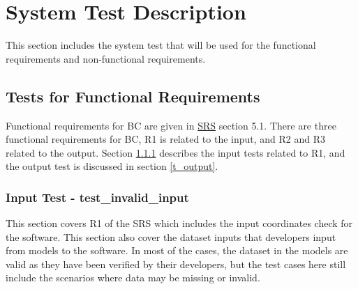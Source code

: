 \documentclass[12pt, titlepage]{article}
\begin{document}




\section{System Test Description}\label{STD}
This section includes the system test that will be used for the functional requirements and non-functional requirements.
\subsection{Tests for Functional Requirements}
Functional requirements for BC are given in \href{https://github.com/CynthiaLiu0805/BridgeCorrosion/blob/main/docs/SRS/SRS.pdf}{SRS} section 5.1. There are three functional requirements for BC, R1 is related to the input, and R2 and R3 related to the output. Section \ref{t_input} describes the input tests related to R1, and the output test is discussed in section \ref{t_output}.
\\



\subsubsection{Input Test - test\_invalid\_input}\label{t_input}
This section covers R1 of the SRS which includes the input coordinates check for the software. This section also cover the dataset inputs that developers input from models to the software. In most of the cases, the dataset in the models are valid as they have been verified by their developers, but the test cases here still include the scenarios where data may be missing or invalid.
\end{document}
